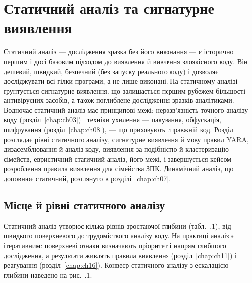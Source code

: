 \chapter{Статичний аналіз та сигнатурне виявлення}
\label{chap:ch06}

Статичний аналіз --- дослідження зразка без його виконання --- є історично першим і досі базовим підходом до виявлення й вивчення злоякісного коду. Він дешевий, швидкий, безпечний (без запуску реального коду) і дозволяє досліджувати всі гілки програми, а не лише виконані. На статичному аналізі ґрунтується сигнатурне виявлення, що залишається першим рубежем більшості антивірусних засобів, а також поглиблене дослідження зразків аналітиками. Водночас статичний аналіз має принципові межі: нерозв'язність точного аналізу коду (розділ~\ref{chap:ch03}) і техніки ухилення --- пакування, обфускація, шифрування (розділ~\ref{chap:ch08}), --- що приховують справжній код. Розділ розглядає рівні статичного аналізу, сигнатурне виявлення й мову правил YARA, дизасемблювання й аналіз коду, виявлення за подібністю й кластеризацію сімейств, евристичний статичний аналіз, його межі, і завершується кейсом розроблення правила виявлення для сімейства ЗПК. Динамічний аналіз, що доповнює статичний, розглянуто в розділі~\ref{chap:ch07}.

\section{Місце й рівні статичного аналізу}\label{sec:ch06-levels}

Статичний аналіз утворює кілька рівнів зростаючої глибини (табл.~\thechapter.1), від швидкого поверхневого до трудомісткого аналізу коду. На практиці аналіз є ітеративним: поверхневі ознаки визначають пріоритет і напрям глибшого дослідження, а результати живлять правила виявлення (розділ~\ref{chap:ch11}) і реагування (розділ~\ref{chap:ch16}). Конвеєр статичного аналізу з ескалацією глибини наведено на рис.~\thechapter.1.

\begin{tikzfig}
\end{tikzfig}

